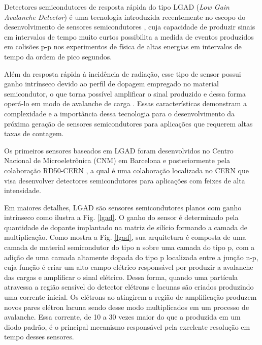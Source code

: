 Detectores semicondutores de resposta rápida do tipo LGAD ({\it Low Gain Avalanche Detector}) é uma tecnologia introduzida recentemente no escopo do desenvolvimento de sensores semicondutores \cite{JIN_LGAD,NIMA_LGAD}, cuja capacidade de produzir sinais em intervalos de tempo muito curtos possibilita a medida de eventos produzidos em colisões p-p nos experimentos de física de altas energias em intervalos de tempo da ordem de pico segundos. 

Além da resposta rápida à incidência de radiação, esse tipo de sensor possui ganho intrínseco devido ao perfil de dopagem empregado no material semicondutor, o que torna possível amplificar o sinal produzido e dessa forma operá-lo em modo de avalanche de carga \cite{JIN_LGAD,NIMA_LGAD}. Essas características demonstram a complexidade e a importância dessa tecnologia para o desenvolvimento da próxima geração de sensores semicondutores para aplicações que requerem altas taxas de contagem.

Os primeiros sensores baseados em LGAD foram desenvolvidos no Centro Nacional de Microeletrônica (CNM) em Barcelona e posteriormente pela colaboração RD50-CERN \cite{tdr,JIN_LGAD,NIMA_LGAD}, a qual é uma colaboração localizada no CERN que visa desenvolver detectores semicondutores para aplicações com feixes de alta intensidade.%

Em maiores detalhes, LGAD são sensores semicondutores planos com ganho intrínseco como ilustra a Fig. \ref{lgad}. O ganho do sensor é determinado pela quantidade de dopante implantado na matriz de silício formando a camada de multiplicação. Como mostra a Fig. \ref{lgad}, sua arquitetura é composta de uma camada de material semicondutor do tipo n sobre uma camada do tipo p, com a adição de uma camada altamente dopada do tipo p localizada entre a junção n-p, cuja função é criar um alto campo elétrico responsável por produzir a avalanche das cargas e amplificar o sinal elétrico. Dessa forma, quando uma partícula atravessa a região sensível do detector  elétrons e lacunas são criados produzindo uma corrente inicial. Os elétrons ao atingirem a região de amplificação produzem novos pares elétron lacuna sendo desse modo multiplicados em um processo de avalanche. Essa corrente, de 10 a 30 vezes maior do que a produzida em um diodo padrão, é o principal mecanismo responsável pela excelente resolução em tempo desses sensores. 

